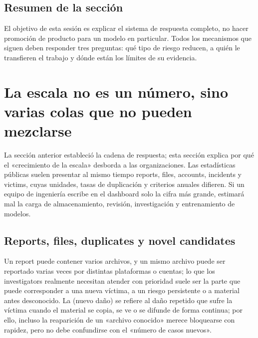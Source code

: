 \documentclass[a4paper]{article}
\begin{document}

\subsection{Resumen de la sección}

El objetivo de esta sesión es explicar el sistema de respuesta completo, no hacer promoción de producto para un modelo en particular. Todos los mecanismos que siguen deben responder tres preguntas: qué tipo de riesgo reducen, a quién le transfieren el trabajo y dónde están los límites de su evidencia.
\section{La escala no es un número, sino varias colas que no pueden mezclarse}

La sección anterior estableció la cadena de respuesta; esta sección explica por qué el «crecimiento de la escala» desborda a las organizaciones. Las estadísticas públicas suelen presentar al mismo tiempo reports, files, accounts, incidents y victims, cuyas unidades, tasas de duplicación y criterios anuales difieren. Si un equipo de ingeniería escribe en el dashboard solo la cifra más grande, estimará mal la carga de almacenamiento, revisión, investigación y entrenamiento de modelos.

\subsection{Reports, files, duplicates y novel candidates}

Un report puede contener varios archivos, y un mismo archivo puede ser reportado varias veces por distintas plataformas o cuentas; lo que los investigators realmente necesitan atender con prioridad suele ser la parte que puede corresponder a una nueva víctima, a un riesgo persistente o a material antes desconocido. La  (nuevo daño) se refiere al daño repetido que sufre la víctima cuando el material se copia, se ve o se difunde de forma continua; por ello, incluso la reaparición de un «archivo conocido» merece bloquearse con rapidez, pero no debe confundirse con el «número de casos nuevos».
\end{document}
